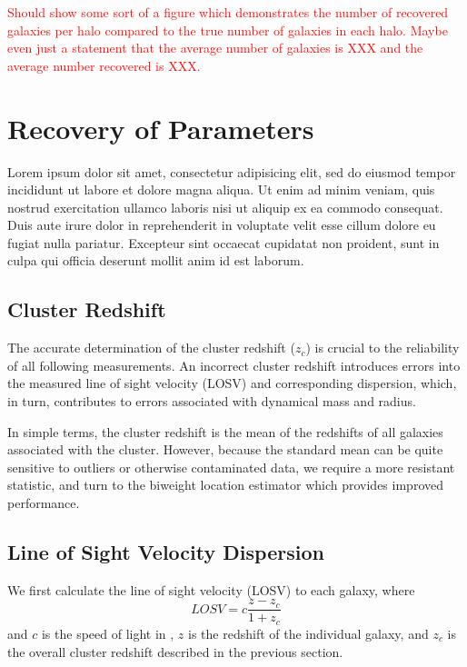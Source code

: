 \documentclass[apj, revtex4]{emulateapj}
\newcommand{\editorial}[1]{\textcolor{red}{#1} }
\begin{document}
\editorial{Should show some sort of a figure which demonstrates the number of recovered galaxies per halo compared to the true number of galaxies in each halo. Maybe even just a statement that the average number of galaxies is XXX and the average number recovered is XXX.}

\section{Recovery of Parameters}

Lorem ipsum dolor sit amet, consectetur adipisicing elit, sed do eiusmod tempor incididunt ut labore et dolore magna aliqua. Ut enim ad minim veniam, quis nostrud exercitation ullamco laboris nisi ut aliquip ex ea commodo consequat. Duis aute irure dolor in reprehenderit in voluptate velit esse cillum dolore eu fugiat nulla pariatur. Excepteur sint occaecat cupidatat non proident, sunt in culpa qui officia deserunt mollit anim id est laborum.

\subsection{Cluster Redshift}
The accurate determination of the cluster redshift ($z_c$) is crucial to the reliability of all following measurements. An incorrect cluster redshift introduces errors into the measured line of sight velocity (LOSV) and corresponding dispersion, which, in turn, contributes to errors associated with dynamical mass and radius. 

In simple terms, the cluster redshift is the  mean of the redshifts of all galaxies associated with the cluster. However, because the standard mean can be quite sensitive to outliers or otherwise contaminated data, we require a more resistant statistic, and turn to the biweight location estimator \citep{Beers1990} which provides improved performance. 

\subsection{Line of Sight Velocity Dispersion}
We first calculate the line of sight velocity (LOSV) to each galaxy, where
\begin{equation}
	LOSV = c\frac{z - z_c}{1+z_c}
\end{equation}
and $c$ is the speed of light in \kms, $z$ is the redshift of the individual galaxy, and $z_c$ is the overall cluster redshift described in the previous section.
\end{document}
